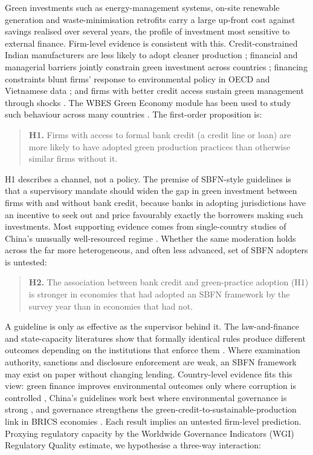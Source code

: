 \documentclass[review,authoryear,12pt]{elsarticle}
\begin{document}
Green investments such as energy-management systems, on-site renewable generation and waste-minimisation retrofits carry a large up-front cost against savings realised over several years, the profile of investment most sensitive to external finance. Firm-level evidence is consistent with this. Credit-constrained Indian manufacturers are less likely to adopt cleaner production \citep{ghosh2022}; financial and managerial barriers jointly constrain green investment across countries \citep{dehaas2025,kalantzis2022}; financing constraints blunt firms' response to environmental policy in OECD and Vietnamese data \citep{costa2024,truong2026}; and firms with better credit access sustain green management through shocks \citep{aristei2023}. The WBES Green Economy module has been used to study such behaviour across many countries \citep{asif2025,phan2026}. The first-order proposition is:

\begin{quotation}
\noindent\textbf{H1.} Firms with access to formal bank credit (a credit line or loan) are more likely to have adopted green production practices than otherwise similar firms without it.
\end{quotation}

H1 describes a channel, not a policy. The premise of SBFN-style guidelines is that a supervisory mandate should widen the gap in green investment between firms with and without bank credit, because banks in adopting jurisdictions have an incentive to seek out and price favourably exactly the borrowers making such investments. Most supporting evidence comes from single-country studies of China's unusually well-resourced regime \citep{dai2025,gao2022}. Whether the same moderation holds across the far more heterogeneous, and often less advanced, set of SBFN adopters is untested:

\begin{quotation}
\noindent\textbf{H2.} The association between bank credit and green-practice adoption (H1) is stronger in economies that had adopted an SBFN framework by the survey year than in economies that had not.
\end{quotation}

A guideline is only as effective as the supervisor behind it. The law-and-finance and state-capacity literatures show that formally identical rules produce different outcomes depending on the institutions that enforce them \citep{acemoglu2001,laporta1998,levine2005}. Where examination authority, sanctions and disclosure enforcement are weak, an SBFN framework may exist on paper without changing lending. Country-level evidence fits this view: green finance improves environmental outcomes only where corruption is controlled \citep{shi2024}, China's guidelines work best where environmental governance is strong \citep{chi2023}, and governance strengthens the green-credit-to-sustainable-production link in BRICS economies \citep{jia2026}. Each result implies an untested firm-level prediction. Proxying regulatory capacity by the Worldwide Governance Indicators (WGI) Regulatory Quality estimate, we hypothesise a three-way interaction:
\end{document}

